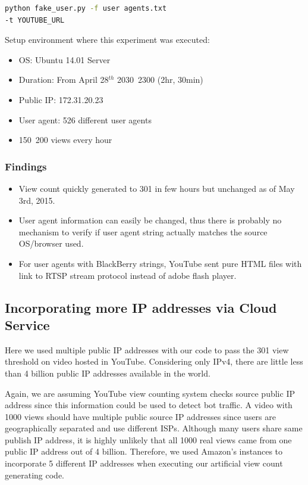 \documentclass[conference]{IEEEtran}
\begin{document}
\begin{lstlisting}[frame=single, language=bash]
python fake_user.py -f user agents.txt
-t YOUTUBE_URL
\end{lstlisting}

Setup environment where this experiment was executed:
\begin{itemize}
  \setlength\itemsep{-0.1em}
  \item OS: Ubuntu 14.01 Server
  \item Duration: From April 28$^{th}$ 2030~2300 (2hr, 30min)
  \item Public IP: 172.31.20.23
  \item User agent: 526 different user agents
  \item 150~200 views every hour
\end{itemize}

\subsubsection*{Findings}
\begin{itemize}
  \setlength\itemsep{-0.1em}
  \item View count quickly generated to 301 in few hours but unchanged as of May 3rd, 2015.
  \item User agent information can easily be changed, thus there is probably no mechanism to verify if user agent string actually matches the source OS/browser used.
  \item For user agents with BlackBerry strings, YouTube sent pure HTML files with link to RTSP stream protocol instead of adobe flash player.
\end{itemize}


\subsection{Incorporating more IP addresses via Cloud Service}

Here we used multiple public IP addresses with our code to pass the 301 view threshold on video hosted in YouTube. Considering only IPv4, there are little less than 4 billion public IP addresses available in the world.

Again, we are assuming YouTube view counting system checks source public IP address since this information could be used to detect bot traffic. A video with 1000 views should have multiple public source IP addresses since users are geographically separated and use different ISPs. Although many users share same publish IP address, it is highly unlikely that all 1000 real views came from one public IP address out of 4 billion. Therefore, we used Amazon’s instances to incorporate 5 different IP addresses when executing our artificial view count generating code.
\end{document}
